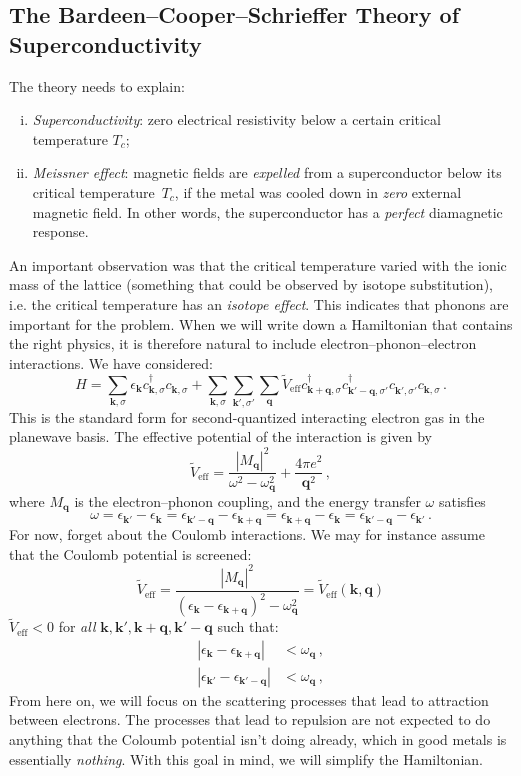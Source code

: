 \subsection{The Bardeen--Cooper--Schrieffer Theory of Superconductivity}
The theory needs to explain:
\begin{enumerate}[(i)]
  \item \emph{Superconductivity}: zero electrical resistivity below a certain critical temperature $T_c$;
  \item \emph{Meissner effect}: magnetic fields are \emph{expelled} from a superconductor below its critical temperature~$T_c$, if the metal was cooled down in \emph{zero} external magnetic field.
        In other words, the superconductor has a \emph{perfect} diamagnetic response.
\end{enumerate}
An important observation was that the critical temperature varied with the ionic mass of the lattice (something that could be observed by isotope substitution), i.e. the critical temperature has an \emph{isotope effect}.
This indicates that phonons are important for the problem.
When we will write down a Hamiltonian that contains the right physics, it is therefore natural to include electron--phonon--electron interactions.
We have considered:
\[
  H = \sum_{\bm k,\sigma} \epsilon_{\bm k} c^\dagger_{\bm k,\sigma} c^{\phantom{\dagger}}_{\bm k,\sigma}
    + \sum_{\bm k,\sigma} \sum_{\bm k',\sigma'}\sum_{\bm q} \tilde{V}_\textrm{eff} c^\dagger_{\bm k+\bm q,\sigma} c^\dagger_{\bm k'-\bm q,\sigma'} c^{\phantom{\dagger}}_{\bm k',\sigma'} c^{\phantom{\dagger}}_{\bm k,\sigma} \,.
\]
This is the standard form for second-quantized interacting electron gas in the planewave basis.
The effective potential of the interaction is given by
\[
  \tilde{V}_\textrm{eff} = \frac{|M_{\bm q}|^2}{\omega^2-\omega^2_{\bm q}} + \frac{4\pi e^2}{\bm q^2} \,,
\]
where $M_{\bm q}$ is the electron--phonon coupling, and the energy transfer $\omega$ satisfies
\[
  \omega = \epsilon_{\bm k'} - \epsilon_{\bm k} = \epsilon_{\bm k'-\bm q} - \epsilon_{\bm k + \bm q} = \epsilon_{\bm k+\bm q} - \epsilon_{\bm k} = \epsilon_{\bm k'-\bm q} - \epsilon_{\bm k'} \,.
\]
For now, forget about the Coulomb interactions.
We may for instance assume that the Coulomb potential is screened:
\[
  \tilde{V}_\textrm{eff} = \frac{|M_{\bm q}|^2}{(\epsilon_{\bm k}-\epsilon_{\bm k+\bm q})^2 - \omega_{\bm q}^2} = \tilde{V}_\textrm{eff}(\bm k,\bm q)
\]
$\tilde{V}_\textrm{eff} < 0$ for \emph{all} $\bm k, \bm k', \bm k+\bm q, \bm k'-\bm q$ such that:
\[
  \begin{aligned}
    |\epsilon_{\bm k}  - \epsilon_{\bm k+\bm q}|  &< \omega_{\bm q} \,, \\
    |\epsilon_{\bm k'} - \epsilon_{\bm k'-\bm q}| &< \omega_{\bm q} \,, 
  \end{aligned}
\]
From here on, we will focus on the scattering processes that lead to attraction between electrons.
The processes that lead to repulsion are not expected to do anything that the Coloumb potential isn't doing already, which in good metals is essentially \emph{nothing}.
With this goal in mind, we will simplify the Hamiltonian.


